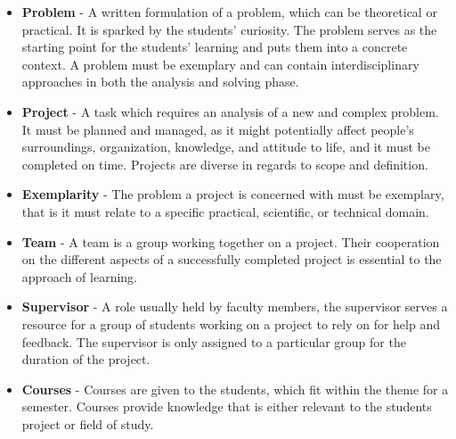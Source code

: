 \begin{itemize}
	\item \textbf{Problem} - A written formulation of a problem, which can be theoretical or practical. 
	It is sparked by the students' curiosity. 
	The problem serves as the starting point for the students' learning and puts them into a concrete context. 
	A problem must be exemplary and can contain interdisciplinary approaches	in both the analysis and solving phase.
	\item \textbf{Project} - A task which requires an analysis of a new and complex problem. It must be planned and managed, as it might potentially affect people's surroundings, organization, knowledge, and attitude to life, and it must be completed on time. Projects are diverse in regards to scope and definition.
	\item \textbf{Exemplarity} - The problem a project is concerned with must be exemplary, that is it must relate to a specific practical, scientific, or technical domain.
	\item \textbf{Team} - A team is a group working together on a project. 
	Their cooperation on the different aspects of a successfully completed project is essential to the approach of learning.
	\item \textbf{Supervisor} - A role usually held by faculty members, the supervisor serves a resource for a group of students working on a project to rely on for help and feedback. 
	The supervisor is only assigned to a particular group for the duration of the project. 
	\item \textbf{Courses} - Courses are given to the students, which fit within the theme for a semester. 
	Courses provide knowledge that is either relevant to the students project or field of study.
\end{itemize}

